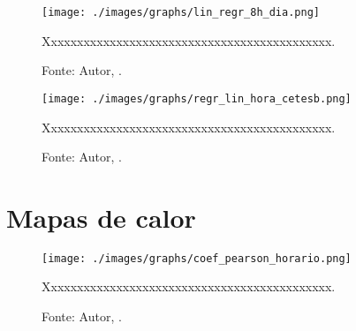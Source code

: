 
\begin{figure}[H]
    \centering
    \texttt{[image: ./images/graphs/lin\_regr\_8h\_dia.png]}
    \caption{Xxxxxxxxxxxxxxxxxxxxxxxxxxxxxxxxxxxxxxxxxxxx.}
    \label{fig:lin_regr_8h_dia.png}
    \caption*{Fonte: Autor, \imprimirdata.}
\end{figure}




\begin{figure}[H]
    \centering
    \texttt{[image: ./images/graphs/regr\_lin\_hora\_cetesb.png]}
    \caption{Xxxxxxxxxxxxxxxxxxxxxxxxxxxxxxxxxxxxxxxxxxxx.}
    \label{fig:regr_lin_hora_cetesb.png}
    \caption*{Fonte: Autor, \imprimirdata.}
\end{figure}





\section{Mapas de calor}


\begin{figure}[H]
    \centering
    \texttt{[image: ./images/graphs/coef\_pearson\_horario.png]}
    \caption{Xxxxxxxxxxxxxxxxxxxxxxxxxxxxxxxxxxxxxxxxxxxx.}
    \label{fig:coef_pearson_horario.png}
    \caption*{Fonte: Autor, \imprimirdata.}
\end{figure}



